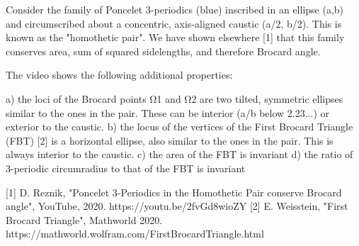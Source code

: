 Consider the family of Poncelet 3-periodics (blue) inscribed in an ellipse (a,b) and circumscribed about a concentric, axis-aligned caustic (a/2, b/2). This is known as the "homothetic pair". We have shown elsewhere [1] that this family conserves area, sum of squared sidelengths, and therefore Brocard angle.

The video shows the following additional properties:

a) the loci of the Brocard points Ω1 and Ω2 are two tilted, symmetric ellipses similar to the ones in the pair. These can be interior (a/b below 2.23...) or exterior to the caustic.
b) the locus of the vertices of the First Brocard Triangle (FBT) [2] is a horizontal ellipse, also similar to the ones in the pair. This is always interior to the caustic.
c) the area of the FBT is invariant
d) the ratio of 3-periodic circumradius to that of the FBT is invariant

[1] D. Reznik, "Poncelet 3-Periodics in the Homothetic Pair conserve Brocard angle", YouTube, 2020. https://youtu.be/2fvGd8wioZY
[2] E. Weisstein, "First Brocard Triangle", Mathworld 2020. https://mathworld.wolfram.com/FirstBrocardTriangle.html